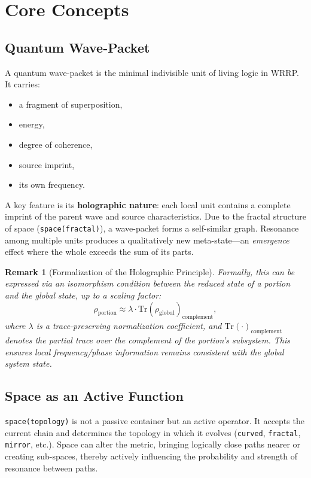 \documentclass[11pt,a4paper]{article}
\newcommand{\tr}[1]{\text{Tr}\left(#1\right)}
\newtheorem{remark}{Remark}
\begin{document}
\section{Core Concepts}

\subsection{Quantum Wave-Packet}

A quantum wave-packet is the minimal indivisible unit of living logic in WRRP. It carries:
\begin{itemize}[leftmargin=*]
    \item a fragment of superposition,
    \item energy,
    \item degree of coherence,
    \item source imprint,
    \item its own frequency.
\end{itemize}

A key feature is its \textbf{holographic nature}: each local unit contains a complete imprint of the parent wave and source characteristics. Due to the fractal structure of space (\texttt{space(fractal)}), a wave-packet forms a self-similar graph. Resonance among multiple units produces a qualitatively new meta-state---an \textit{emergence} effect where the whole exceeds the sum of its parts.

\begin{remark}[Formalization of the Holographic Principle]
Formally, this can be expressed via an isomorphism condition between the reduced state of a portion and the global state, up to a scaling factor:
\begin{equation}
    \rho_{\text{portion}} \approx \lambda \cdot \tr{\rho_{\text{global}}}_{\text{complement}},
\end{equation}
where $\lambda$ is a trace-preserving normalization coefficient, and $\tr{\cdot}_{\text{complement}}$ denotes the partial trace over the complement of the portion's subsystem. This ensures local frequency/phase information remains consistent with the global system state.
\end{remark}

\subsection{Space as an Active Function}

\texttt{space(topology)} is not a passive container but an active operator. It accepts the current chain and determines the topology in which it evolves (\texttt{curved}, \texttt{fractal}, \texttt{mirror}, etc.). Space can alter the metric, bringing logically close paths nearer or creating sub-spaces, thereby actively influencing the probability and strength of resonance between paths.
\end{document}
